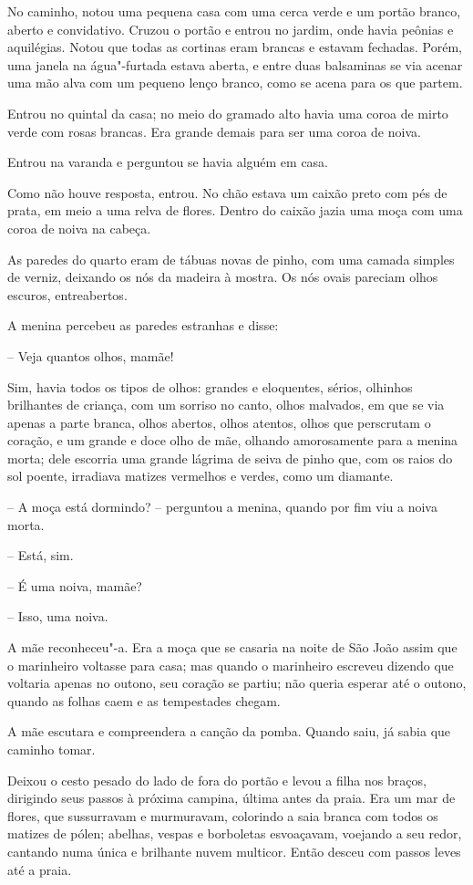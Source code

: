 No caminho, notou uma pequena casa com uma cerca verde e um portão
branco, aberto e convidativo. Cruzou o portão e entrou no jardim, onde
havia peônias e aquilégias. Notou que todas as cortinas eram brancas e
estavam fechadas. Porém, uma janela na água"-furtada estava aberta, e
entre duas balsaminas se via acenar uma mão alva com um pequeno lenço
branco, como se acena para os que partem.

Entrou no quintal da casa; no meio do gramado alto havia uma coroa de
mirto verde com rosas brancas. Era grande demais para ser uma coroa de
noiva. 

Entrou na varanda e perguntou se havia alguém em casa. 

Como não houve resposta, entrou. No chão estava um caixão preto com pés
de prata, em meio a uma relva de flores. Dentro do caixão jazia uma
moça com uma coroa de noiva na cabeça.

As paredes do quarto eram de tábuas novas de pinho, com uma camada
simples de verniz, deixando os nós da madeira à mostra. Os nós ovais
pareciam olhos escuros, entreabertos. 

A menina percebeu as paredes estranhas e disse:  

-- Veja quantos olhos, mamãe!

Sim, havia todos os tipos de olhos: grandes e eloquentes, sérios,
olhinhos brilhantes de criança, com um sorriso no canto, olhos
malvados, em que se via apenas a parte branca, olhos abertos, olhos
atentos, olhos que perscrutam o coração, e um grande e doce olho de
mãe, olhando amorosamente para a menina morta; dele escorria uma grande
lágrima de seiva de pinho que, com os raios do sol poente, irradiava
matizes vermelhos e verdes, como um diamante.

-- A moça está dormindo? -- perguntou a menina, quando por fim viu a noiva
morta.

-- Está, sim.

-- É uma noiva, mamãe?

-- Isso, uma noiva.

A mãe reconheceu"-a. Era a moça que se casaria na noite de São João
assim que o marinheiro voltasse para casa; mas quando o marinheiro
escreveu dizendo que voltaria apenas no outono, seu coração se partiu;
não queria esperar até o outono, quando as folhas caem e as tempestades
chegam. 

A mãe escutara e compreendera a canção da pomba.  Quando saiu, já sabia
que caminho tomar. 

Deixou o cesto pesado do lado de fora do portão e levou a filha nos
braços, dirigindo seus passos à próxima campina, última antes da praia.
Era um mar de flores, que sussurravam e murmuravam, colorindo a saia
branca com todos os matizes de pólen; abelhas, vespas e borboletas
esvoaçavam, voejando a seu redor, cantando numa única e brilhante nuvem
multicor. Então desceu com passos leves até a praia.

